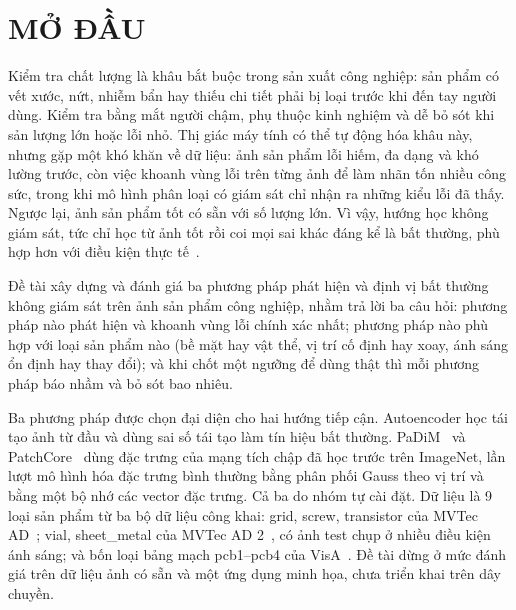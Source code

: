 \chapter*{MỞ ĐẦU}

Kiểm tra chất lượng là khâu bắt buộc trong sản xuất công nghiệp: sản phẩm có vết xước,
nứt, nhiễm bẩn hay thiếu chi tiết phải bị loại trước khi đến tay người dùng. Kiểm tra bằng mắt người chậm, phụ thuộc
kinh nghiệm và dễ bỏ sót khi sản lượng lớn hoặc lỗi nhỏ. Thị giác máy tính có thể tự động hóa khâu này, nhưng gặp một
khó khăn về dữ liệu: ảnh sản phẩm lỗi hiếm, đa dạng và khó lường trước, còn việc khoanh vùng lỗi trên từng ảnh để làm
nhãn tốn nhiều công sức, trong khi mô hình phân loại có giám sát chỉ nhận ra những kiểu lỗi đã thấy. Ngược lại, ảnh sản phẩm tốt có sẵn với số lượng lớn. Vì vậy, hướng học không giám sát, tức chỉ học từ ảnh tốt rồi
coi mọi sai khác đáng kể là bất thường, phù hợp hơn với điều kiện thực tế~\cite{bergmannMVTecADComprehensive2019}.

Đề tài xây dựng và đánh giá ba phương pháp phát hiện và định vị bất thường không giám sát trên
ảnh sản phẩm công nghiệp, nhằm trả lời ba câu hỏi: phương pháp nào phát hiện và khoanh vùng lỗi chính xác nhất;
phương pháp nào phù hợp với loại sản phẩm nào (bề mặt hay vật thể, vị trí cố định hay xoay, ánh sáng ổn định hay
thay đổi); và khi chốt một ngưỡng để dùng thật thì mỗi phương pháp báo nhầm và bỏ sót bao nhiêu.

Ba phương pháp được chọn đại diện cho hai hướng tiếp cận. Autoencoder học tái tạo ảnh từ đầu và dùng sai số tái tạo
làm tín hiệu bất thường. PaDiM~\cite{defardPaDiMPatchDistribution2021} và PatchCore~\cite{rothTotalRecallIndustrial2022}
dùng đặc trưng của mạng tích chập đã học trước trên ImageNet, lần lượt mô hình hóa đặc trưng bình thường bằng phân
phối Gauss theo vị trí và bằng một bộ nhớ các vector đặc trưng. Cả ba do nhóm tự cài đặt. Dữ liệu là 9 loại sản phẩm
từ ba bộ dữ liệu công khai: grid, screw, transistor của MVTec AD~\cite{bergmannMVTecADComprehensive2019}; vial,
sheet\_metal của MVTec AD 2~\cite{hecklerkramMVTecAD2Dataset2026}, có ảnh test chụp ở nhiều điều kiện ánh sáng; và bốn
loại bảng mạch pcb1--pcb4 của VisA~\cite{zouSPotDifferenceSelfsupervisedPretraining2022}. Đề tài dừng ở mức đánh giá
trên dữ liệu ảnh có sẵn và một ứng dụng minh họa, chưa triển khai trên dây chuyền.

